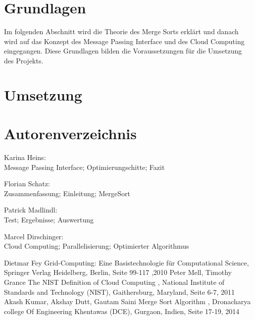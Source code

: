 \documentclass[conference]{IEEEtran}
\begin{document}
\section{Grundlagen}
Im folgenden Abschnitt wird die Theorie des Merge Sorts erklärt und danach wird auf das Konzept des Message Passing Interface und des Cloud Computing eingegangen. Diese Grundlagen bilden die Voraussetzungen für die Umsetzung des Projekts.




\section{Umsetzung}




%




\section*{Autorenverzeichnis}
Karina Heins:\\ 
Message Passing Interface; Optimierungschitte; Fazit

Florian Schatz:\\
 Zusammenfassung; Einleitung; MergeSort
 
Patrick Madlindl:\\
 Test; Ergebnisse; Auswertung
 
 Marcel Dirschinger:\\
 Cloud Computing; Parallelisierung; Optimierter Algorithmus

\begin{thebibliography}{00}
 Dietmar Fey \glqq Grid-Computing: Eine Basistechnologie für Computational Science\grqq{}, Springer Verlag Heidelberg, Berlin, Seite 99-117 ,2010
 Peter Mell, Timothy Grance \glqq The NIST Definition of Cloud Computing \grqq{}, National Institute of Standards and Technology (NIST), Gaithersburg, Maryland, Seite 6-7, 2011
 Akash Kumar, Akshay Dutt, Gautam Saini \glqq Merge Sort Algorithm \grqq{}, Dronacharya college Of Engineering Khentawas (DCE),  Gurgaon, Indien, Seite 17-19, 2014

\end{thebibliography}
\end{document}
